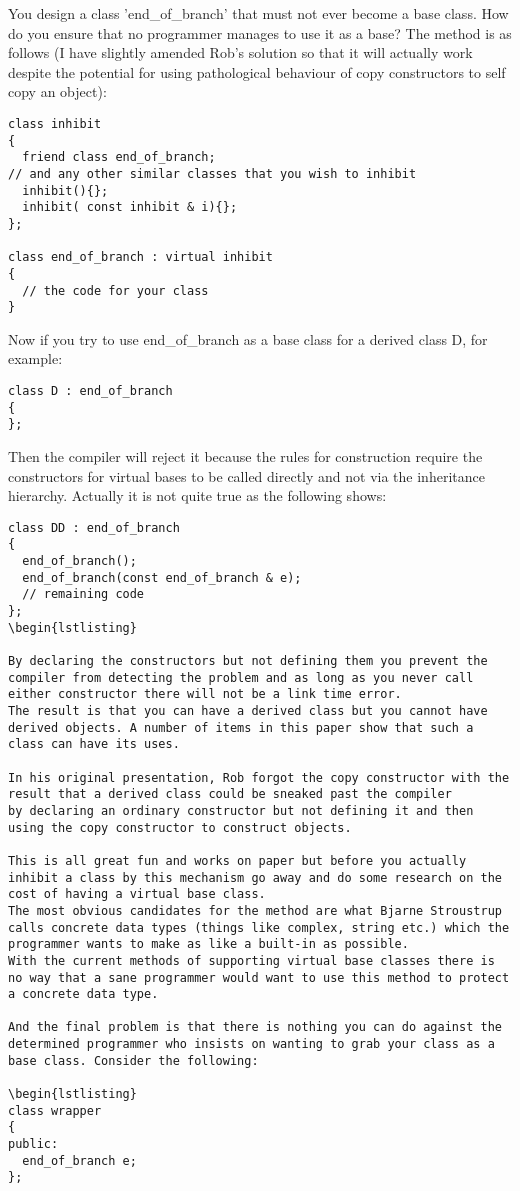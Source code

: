 \documentclass{book}
\begin{document}
You design a class 'end\_of\_branch' that must not ever become a base class. 
How do you ensure that no programmer manages to use it as a base? 
The method is as follows (I have slightly amended Rob's solution so that it will actually work despite the potential for using pathological behaviour of copy constructors to self copy an object):

\begin{lstlisting}
class inhibit 
{
  friend class end_of_branch; 
// and any other similar classes that you wish to inhibit
  inhibit(){};
  inhibit( const inhibit & i){}; 
}; 

class end_of_branch : virtual inhibit 
{
  // the code for your class 
}
\end{lstlisting}

Now if you try to use end\_of\_branch as a base class for a derived class D, for example:

\begin{lstlisting}
class D : end_of_branch
{
};
\end{lstlisting}

Then the compiler will reject it because the rules for construction require the constructors for virtual bases to be called directly and not via the inheritance hierarchy.
Actually it is not quite true as the following shows:

\begin{lstlisting}
class DD : end_of_branch 
{
  end_of_branch();
  end_of_branch(const end_of_branch & e); 
  // remaining code
};
\begin{lstlisting}

By declaring the constructors but not defining them you prevent the compiler from detecting the problem and as long as you never call either constructor there will not be a link time error.
The result is that you can have a derived class but you cannot have derived objects. A number of items in this paper show that such a class can have its uses.

In his original presentation, Rob forgot the copy constructor with the result that a derived class could be sneaked past the compiler 
by declaring an ordinary constructor but not defining it and then using the copy constructor to construct objects.

This is all great fun and works on paper but before you actually inhibit a class by this mechanism go away and do some research on the cost of having a virtual base class.
The most obvious candidates for the method are what Bjarne Stroustrup calls concrete data types (things like complex, string etc.) which the programmer wants to make as like a built-in as possible.
With the current methods of supporting virtual base classes there is no way that a sane programmer would want to use this method to protect a concrete data type.

And the final problem is that there is nothing you can do against the determined programmer who insists on wanting to grab your class as a base class. Consider the following:

\begin{lstlisting}
class wrapper 
{
public: 
  end_of_branch e;
};
\end{lstlisting}
\end{document}

